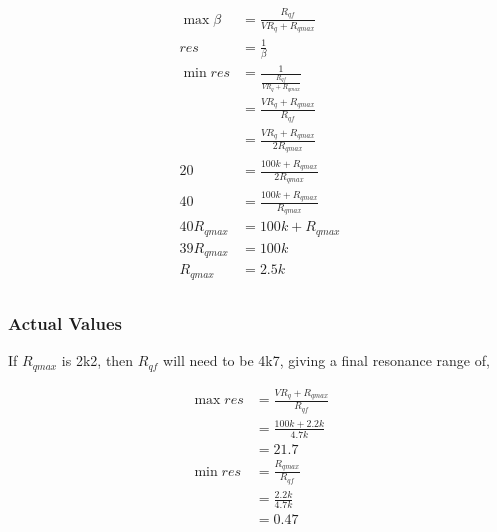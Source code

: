 \documentclass{article}
\begin{document}
\begin{equation*}
\begin{split}
  {\max \beta} & = \frac{R_{qf}}{VR_{q} + R_{qmax}} \\
  res          & = \frac{1}{\beta} \\
  {\min res}   & = \frac{1}{\frac{R_{qf}}{VR_{q} + R_{qmax}}} \\
               & = \frac{VR_{q} + R_{qmax}}{R_{qf}} \\
               & = \frac{VR_{q} + R_{qmax}}{2R_{qmax}} \\
  20           & = \frac{100k + R_{qmax}}{2R_{qmax}} \\
  40           & = \frac{100k + R_{qmax}}{R_{qmax}} \\
  40 R_{qmax}  & = 100k + R_{qmax} \\
  39 R_{qmax}  & = 100k \\
  R_{qmax}     & = 2.5k \\
\end{split}
\end{equation*}

\subsubsection{Actual Values}

If $R_{qmax}$ is 2k2, then $R_{qf}$ will need to be 4k7, giving a final resonance range of,

\begin{equation*}
\begin{split}
  {\max res} & = \frac{VR_{q} + R_{qmax}}{R_{qf}} \\
             & = \frac{100k + 2.2k}{4.7k} \\
             & = 21.7 \\
  {\min res} & = \frac{R_{qmax}}{R_{qf}} \\
             & = \frac{2.2k}{4.7k} \\
             & = 0.47 \\
\end{split}
\end{equation*}
\end{document}
